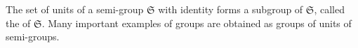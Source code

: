 The set of units of a semi-group $\mathfrak{S}$ with identity forms a subgroup of $\mathfrak{S}$, called the  of $\mathfrak{S}$. Many important examples of groups are obtained as groups of units of semi-groups.
